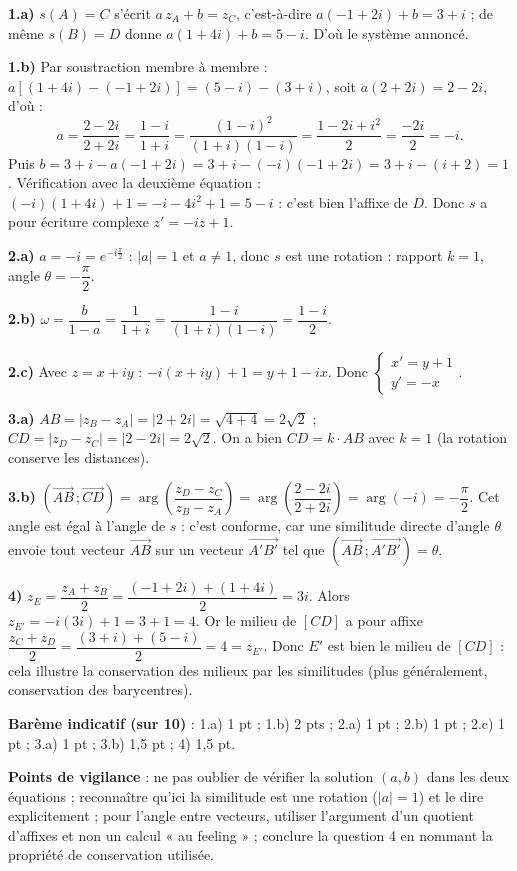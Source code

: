 \documentclass[11pt]{article}
\newcommand{\cle}[1]{{\popxbold\color{popdark}#1}}
\begin{document}
\begin{corrige}
\textbf{1.a)} $s(A) = C$ s'écrit $a\,z_A + b = z_C$, c'est-à-dire $a(-1+2i) + b = 3 + i$ ; de même $s(B) = D$ donne $a(1+4i) + b = 5 - i$. D'où le système annoncé.

\textbf{1.b)} Par soustraction membre à membre : $a\left[(1+4i) - (-1+2i)\right] = (5-i) - (3+i)$, soit $a(2+2i) = 2 - 2i$, d'où :
\[ a = \frac{2-2i}{2+2i} = \frac{1-i}{1+i} = \frac{(1-i)^2}{(1+i)(1-i)} = \frac{1 - 2i + i^2}{2} = \frac{-2i}{2} = -i. \]
Puis $b = 3 + i - a(-1+2i) = 3 + i - (-i)(-1+2i) = 3 + i - (i + 2) = 1$.
Vérification avec la deuxième équation : $(-i)(1+4i) + 1 = -i - 4i^2 + 1 = 5 - i$ : c'est bien l'affixe de $D$. Donc $s$ a pour écriture complexe $z' = -iz + 1$.

\textbf{2.a)} $a = -i = e^{-i\frac{\pi}{2}}$ : $|a| = 1$ et $a \neq 1$, donc $s$ est une \cle{rotation} : rapport $k = 1$, angle $\theta = -\dfrac{\pi}{2}$.

\textbf{2.b)} $\omega = \dfrac{b}{1-a} = \dfrac{1}{1+i} = \dfrac{1-i}{(1+i)(1-i)} = \dfrac{1-i}{2}$.

\textbf{2.c)} Avec $z = x + iy$ : $-i(x+iy) + 1 = y + 1 - ix$. Donc $\begin{cases} x' = y + 1 \\ y' = -x \end{cases}$.

\textbf{3.a)} $AB = |z_B - z_A| = |2 + 2i| = \sqrt{4+4} = 2\sqrt{2}$ ; $CD = |z_D - z_C| = |2 - 2i| = 2\sqrt{2}$. On a bien $CD = k \cdot AB$ avec $k = 1$ (la rotation conserve les distances).

\textbf{3.b)} $\left(\overrightarrow{AB}\,;\overrightarrow{CD}\right) = \arg\left(\dfrac{z_D - z_C}{z_B - z_A}\right) = \arg\left(\dfrac{2-2i}{2+2i}\right) = \arg(-i) = -\dfrac{\pi}{2}$. Cet angle est égal à l'angle de $s$ : c'est conforme, car une similitude directe d'angle $\theta$ envoie tout vecteur $\overrightarrow{AB}$ sur un vecteur $\overrightarrow{A'B'}$ tel que $\left(\overrightarrow{AB}\,;\overrightarrow{A'B'}\right) = \theta$.

\textbf{4)} $z_E = \dfrac{z_A + z_B}{2} = \dfrac{(-1+2i) + (1+4i)}{2} = 3i$. Alors $z_{E'} = -i(3i) + 1 = 3 + 1 = 4$. Or le milieu de $[CD]$ a pour affixe $\dfrac{z_C + z_D}{2} = \dfrac{(3+i)+(5-i)}{2} = 4 = z_{E'}$. Donc $E'$ est bien le milieu de $[CD]$ : cela illustre la \cle{conservation des milieux} par les similitudes (plus généralement, conservation des barycentres).

\textbf{Barème indicatif (sur 10)} : 1.a) 1 pt ; 1.b) 2 pts ; 2.a) 1 pt ; 2.b) 1 pt ; 2.c) 1 pt ; 3.a) 1 pt ; 3.b) 1,5 pt ; 4) 1,5 pt.

\textbf{Points de vigilance} : ne pas oublier de vérifier la solution $(a,b)$ dans les deux équations ; reconnaître qu'ici la similitude est une rotation ($|a|=1$) et le dire explicitement ; pour l'angle entre vecteurs, utiliser l'argument d'un quotient d'affixes et non un calcul « au feeling » ; conclure la question 4 en nommant la propriété de conservation utilisée.
\end{corrige}
\end{document}
